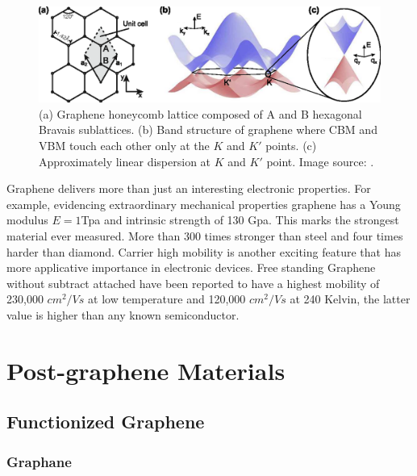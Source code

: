 \begin{figure}[htbp!] 
\centering  
\includegraphics[width=\textwidth]{gra_lat_band.eps}
\caption[Graphene lattice and band structure.]{(a) Graphene honeycomb lattice composed of A and B hexagonal Bravais sublattices. (b) Band structure of graphene where CBM and VBM touch each other only at the $K$ and $K'$ points. (c) Approximately linear dispersion at $K$ and $K'$ point. Image source: \cite{Guttinger2012}. }  
\label{fig:gra_band}
\end{figure} 

Graphene delivers more than just an interesting electronic properties. For example, evidencing extraordinary mechanical properties graphene has a Young modulus $E = 1$Tpa and intrinsic strength of 130 Gpa\cite{Lee385}. This marks the strongest material ever measured. More than 300 times stronger than steel and four times harder than diamond. Carrier high mobility is another exciting feature that has more applicative importance in electronic devices. Free standing Graphene without subtract attached have been reported to have a highest mobility of 230,000 $cm^2/Vs$ at low temperature\cite{Bolotin2008a} and 120,000 $cm^2/Vs$ at 240 Kelvin, the latter value is higher than any known semiconductor\cite{Bolotin2008b}.
















 
\section{Post-graphene Materials}
\subsection{Functionized Graphene}
\subsubsection{Graphane}
